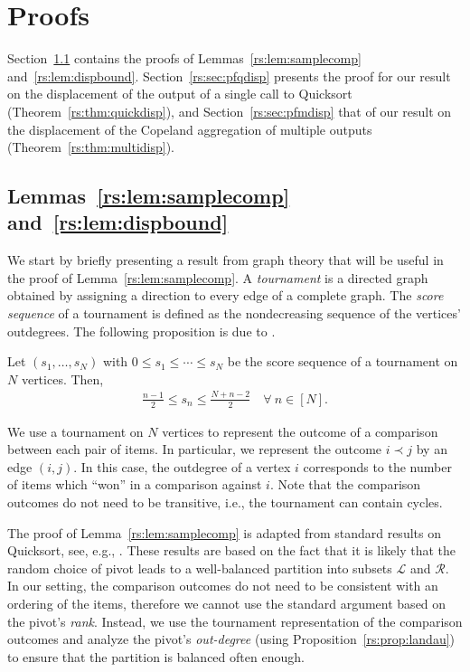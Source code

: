 \section{Proofs}  %
\label{rs:sec:proofs}

Section~\ref{rs:sec:pflemmas} contains the proofs of Lemmas~\ref{rs:lem:samplecomp} and~\ref{rs:lem:dispbound}.
Section~\ref{rs:sec:pfqdisp} presents the proof for our result on the displacement of the output of a single call to Quicksort (Theorem~\ref{rs:thm:quickdisp}), and Section~\ref{rs:sec:pfmdisp} that of our result on the displacement of the Copeland aggregation of multiple outputs (Theorem~\ref{rs:thm:multidisp}).

\subsection{Lemmas~\ref{rs:lem:samplecomp} and~\ref{rs:lem:dispbound}}
\label{rs:sec:pflemmas}

We start by briefly presenting a result from graph theory that will be useful in the proof of Lemma~\ref{rs:lem:samplecomp}.
A \emph{tournament} is a directed graph obtained by assigning a direction to every edge of a complete graph.
The \emph{score sequence} of a tournament is defined as the nondecreasing sequence of the vertices' outdegrees.
The following proposition is due to \citet{landau1953dominance}.

\begin{proposition}
\label{rs:prop:landau}
Let $(s_1, \ldots, s_N)$ with $0 \le s_1 \le \cdots \le s_N$ be the score sequence of a tournament on $N$ vertices.
Then,
\begin{align*}
\frac{n - 1}{2} \le s_n \le \frac{N + n - 2}{2} \quad \forall\ n \in [N].
\end{align*}
\end{proposition}

We use a tournament on $N$ vertices to represent the outcome of a comparison between each pair of items.
In particular, we represent the outcome $i \prec j$ by an edge $(i, j)$.
In this case, the outdegree of a vertex $i$ corresponds to the number of items which ``won'' in a comparison against $i$.
Note that the comparison outcomes do not need to be transitive, i.e., the tournament can contain cycles.

The proof of Lemma~\ref{rs:lem:samplecomp} is adapted from standard results on Quicksort, see, e.g., \citet[][Section 3.3.3]{dubhashi2009concentration}.
These results are based on the fact that it is likely that the random choice of pivot leads to a well-balanced partition into subsets $\mathcal{L}$ and $\mathcal{R}$.
In our setting, the comparison outcomes do not need to be consistent with an ordering of the items, therefore we cannot use the standard argument based on the pivot's \emph{rank}.
Instead, we use the tournament representation of the comparison outcomes and analyze the pivot's \emph{out-degree} (using Proposition~\ref{rs:prop:landau}) to ensure that the partition is balanced often enough.


